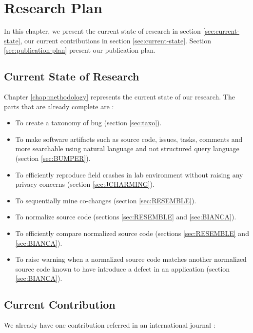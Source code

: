 
\chapter{Research Plan\label{chap:plan}}

In this chapter, we present the current state of research in section \ref{sec:current-state}, our current contributions in section \ref{sec:current-state}. Section \ref{sec:publication-plan} present our publication plan.

\section{Current State of Research\label{sec:current-state}}

Chapter \ref{chap:methodology} represents the current state of our research. The parts that are already complete are :

\begin{itemize}
	\item To create a taxonomy of bug (section \ref{sec:taxo}).
	\item To make software artifacts such as source code, issues, tasks, comments and more searchable using natural language and not structured query language (section \ref{sec:BUMPER}).
	\item To efficiently reproduce field crashes in lab environment without raising any privacy concerns (section \ref{sec:JCHARMING}).
	\item To sequentially mine co-changes (section \ref{sec:RESEMBLE}).
	\item To normalize source code (sections \ref{sec:RESEMBLE} and \ref{sec:BIANCA}).
	\item To efficiently compare normalized source code (sections \ref{sec:RESEMBLE} and \ref{sec:BIANCA}).
	\item To raise warning when a normalized source code matches another normalized source code known to have introduce a defect in an application (section \ref{sec:BIANCA}).
\end{itemize}

\section{Current Contribution\label{sec:current-state}}

We already have one contribution referred in an international journal \cite{Nayrolles2016a}:

